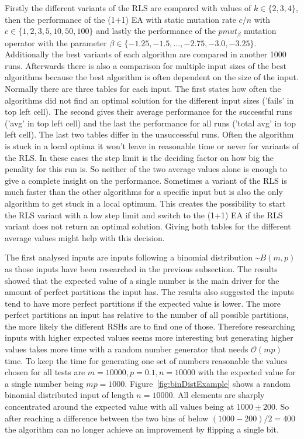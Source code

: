 Firstly the different variants of the RLS are compared with values of $k \in\{2,3,4\}$, then the performance of the (1+1) EA with static mutation rate $c/n$ with $c \in\{1,2,3,5,10,50,100\}$ and lastly the performance of the $pmut_\beta$ mutation operator with the parameter $\beta \in \{-1.25, -1.5, \dots, -2.75,-3.0,-3.25\}$.
Additionally the best variants of each algorithm are compared in another 1000 runs.
Afterwards there is also a comparison for multiple input sizes of the best algorithms because the best algorithm is often dependent on the size of the input.
Normally there are three tables for each input.
The first states how often the algorithms did not find an optimal solution for the different input sizes ('fails' in top left cell).
The second gives their average performance for the successful runs ('avg' in top left cell) and the last the performance for all runs ('total avg' in top left cell).
The last two tables differ in the unsuccessful runs. Often the algorithm is stuck in a local optima it won't leave in reasonable time or never for variants of the RLS.
In these cases the step limit is the deciding factor on how big the penality for this run is.
So neither of the two average values alone is enough to give a complete insight on the performance.
Sometimes a variant of the RLS is much faster than the other algorithms for a specific input but is also the only algorithm to get stuck in a local optimum.
This creates the possibility to start the RLS variant with a low step limit and switch to the (1+1) EA if the RLS variant does not return an optimal solution.
Giving both tables for the different average values might help with this decision.

The first analysed inputs are inputs following a binomial distribution \textasciitilde$B(m,p)$ as those inputs have been researched in the previous subsection.
The results showed that the expected value of a single number is the main driver for the amount of perfect partitions the input has.
The results also suggested the inputs tend to have more perfect partitions if the expected value is lower.
The more perfect partitions an input has relative to the number of all possible partitions, the more likely the different RSHs are to find one of those.
Therefore researching inputs with higher expected values seems more interesting but generating higher values takes more time with a random number generator that needs $\mathcal{O}(mp)$ time.
To keep the time for generating one set of numbers reasonable the values chosen for all tests are $m=10000, p=0.1, n=10000$ with the expected value for a single number being $mp=1000$.
Figure~\ref{fig:binDistExample} shows a random binomial distributed input of length $n=10000$.
All elements are sharply concentrated around the expected value with all values being at $1000\pm200$.
So after reaching a difference between the two bins of below $(1000-200)/2=400$ the algorithm can no longer achieve an improvement by flipping a single bit.

